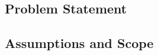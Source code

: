 \placeholder

\subsection{Problem Statement}
\placeholder

\subsection{Assumptions and Scope}
\placeholder